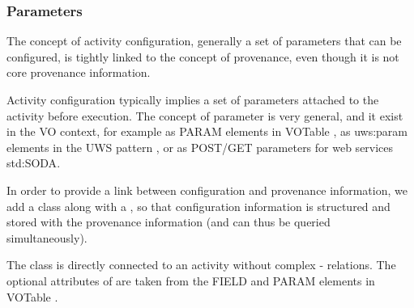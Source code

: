 



\subsubsection{Parameters}\label{sec:parameters}

The concept of activity configuration, generally a set of parameters that can be configured, is tightly linked to the concept of provenance, even though it is not core provenance information.

Activity configuration typically implies a set of parameters attached to the activity before execution. The concept of parameter is very general, and it exist in the VO context, for example as PARAM elements in VOTable \citep{std:VOTABLE}, as uws:param elements in the UWS pattern \citep{std:UWS}, or as POST/GET parameters for web services \citep{see for example}{std:SODA}. 


In order to provide a link between configuration and provenance information, we add a  class along with a , so that configuration information is structured and stored with the provenance information (and can thus be queried simultaneously). 

The  class is directly connected to an activity without complex - relations. 
The optional attributes of  are taken from the FIELD and PARAM elements in VOTable \citep{std:VOTABLE}.

